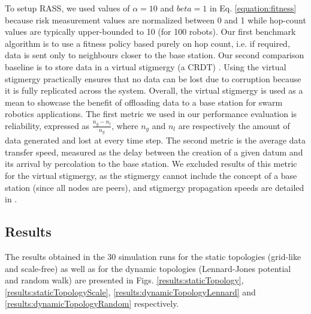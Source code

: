 \documentclass[runningheads]{llncs}
\begin{document}
To setup RASS, we used values of $\alpha = 10$ and $beta = 1$ in Eq. \ref{equation:fitness} because risk measurement values are normalized between 0 and 1 while hop-count values are typically upper-bounded to 10 (for 100 robots). Our first benchmark algorithm is to use a fitness policy based purely on hop count, i.e. if required, data is sent only to neighbours closer to the base station. Our second comparison baseline is to store data in a virtual stigmergy (a CRDT) \cite{pinciroliTuple2016}. Using the virtual stigmergy practically ensures that no data can be lost due to corruption because it is fully replicated across the system. Overall, the virtual stigmergy is used as a mean to showcase the benefit of offloading data to a base station for swarm robotics applications. The first metric we used in our performance evaluation is reliability, expressed as $\frac{n_g - n_l}{n_g}$, where $n_g$ and $n_l$ are respectively the amount of data generated and lost at every time step. The second metric is the average data transfer speed, measured as the delay between the creation of a given datum and its arrival by percolation to the base station. We excluded results of this metric for the virtual stigmergy, as the stigmergy cannot include the concept of a base station (since all nodes are peers), and stigmergy propagation speeds are detailed in \cite{pinciroliTuple2016}. %


\subsection{Results}

The results obtained in the 30 simulation runs for the static topologies (grid-like and scale-free) as well as for the dynamic topologies (Lennard-Jones potential and random walk) are presented in Figs. \ref{results:staticTopology}, \ref{results:staticTopologyScale}, \ref{results:dynamicTopologyLennard} and  \ref{results:dynamicTopologyRandom} respectively.
\end{document}
